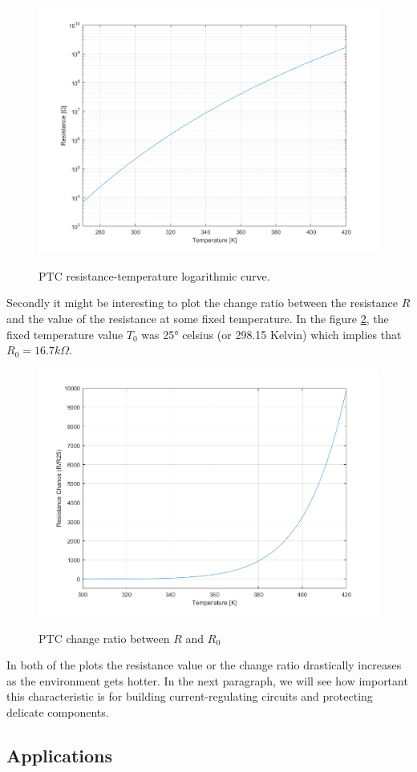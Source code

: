 \begin{figure}[h]
    \centering
    \includegraphics[width = .7\textwidth]{../res/plots/PTC_logarithmic.png}
    \label{fig:PTC_logarithmic}
    \caption{PTC resistance-temperature logarithmic curve.}
\end{figure}

\FloatBarrier\noindent Secondly it might be interesting to plot the change ratio between the resistance $R$ and the value of the resistance at some fixed temperature. In the figure \ref{fig:PTC_ratio}, the fixed temperature value $T_0$ was 25° celsius (or 298.15 Kelvin) which implies that $R_0 = 16.7 k\Omega$.

\begin{figure}[h]
    \centering
    \includegraphics[width = .7\textwidth]{../res/plots/PTC_ratio.png}
    \label{fig:PTC_ratio}
    \caption{PTC change ratio between $R$ and $R_0$}
\end{figure}

\FloatBarrier\noindent In both of the plots the resistance value or the change ratio drastically increases as the environment gets hotter. In the next paragraph, we will see how important this characteristic is for building current-regulating circuits and protecting delicate components.




\subsection{Applications}





